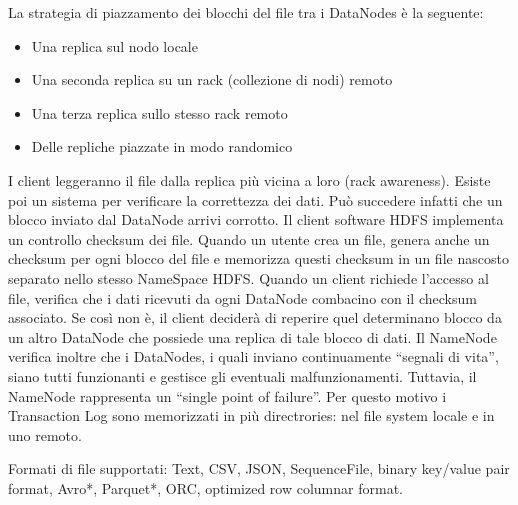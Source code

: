 \documentclass[a4page, 11pt]{article}
\begin{document}
La strategia di piazzamento dei blocchi del file tra i DataNodes è la seguente:
\begin{itemize}[noitemsep]
\item Una replica sul nodo locale
\item Una seconda replica su un rack (collezione di nodi) remoto
\item Una terza replica sullo stesso rack remoto
\item Delle repliche piazzate in modo randomico
\end{itemize}
I client leggeranno il file dalla replica più vicina a loro (rack awareness). Esiste poi un sistema per verificare la correttezza dei dati. Può succedere infatti che un blocco inviato dal DataNode arrivi corrotto. Il client software HDFS implementa un controllo checksum dei file. Quando un utente crea un file, genera anche un checksum per ogni blocco del file e memorizza questi checksum in un file nascosto separato nello stesso NameSpace HDFS. Quando un client richiede l’accesso al file, verifica che i dati ricevuti da ogni DataNode combacino con il checksum associato. Se così non è, il client deciderà di reperire quel determinano blocco da un altro DataNode che possiede una replica di tale blocco di dati. Il NameNode verifica inoltre che i DataNodes, i quali inviano continuamente “segnali di vita”, siano tutti funzionanti e gestisce gli eventuali malfunzionamenti. Tuttavia, il NameNode rappresenta un “single point of failure”. Per questo motivo i Transaction Log sono memorizzati in più directrories: nel file system locale e in uno remoto.

Formati di file supportati: Text, CSV, JSON, SequenceFile, binary key/value pair format, Avro*, Parquet*, ORC, optimized row columnar format.
\end{document}
